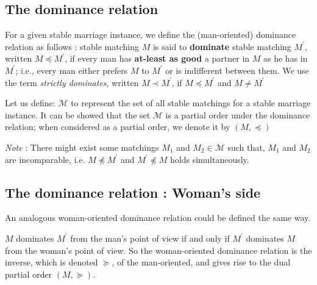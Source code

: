 \subsection{The dominance relation}
    For a given stable marriage instance, we define the (man-oriented) dominance relation as follows : stable matching $M$ is said to \textbf{dominate} stable matching $M^\prime$, written $M \preceq M^\prime$, if every man has \textbf{at-least as good} a partner in $M$ as he has in $M^\prime$; i.e., every man either prefers $M$ to $M^\prime$ or is indifferent between them. We use the term \textit{strictly dominates}, written $M \prec M^\prime$, if $M \preceq M^\prime$ and $M \neq M^\prime$
    
    Let us define: $\mathcal{M}$ to represent the set of all stable matchings for a stable marriage instance. It can be showed that the set $\mathcal{M}$ is a partial order under the dominance relation; when considered as a partial order, we denote it by $(M, \preceq)$
    
     \textit{Note} : There might exist some matchings $M_1$ and $M_2 \in \mathcal{M}$ such that, $M_1$ and $M_2$ are incomparable, i.e. $M \npreceq M^\prime$ and $M^\prime \npreceq M$ holds simultaneously.

\subsection{The dominance relation : Woman's side}
    An analogous woman-oriented dominance relation could be defined the same way.
    
    $M$ dominates $M^\prime$ from the man's point of view if and only if $M^\prime$ dominates $M$ from the woman's point of view. So the woman-oriented dominance relation is the inverse, which is denoted $\succeq$, of the man-oriented, and gives rise to the dual partial order $(M, \succeq)$.

